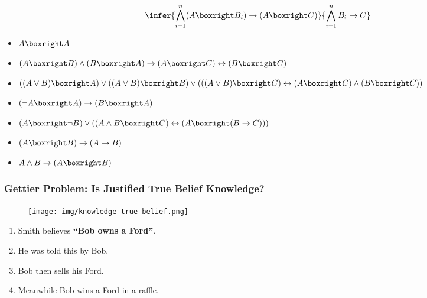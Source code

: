 \documentclass[UTF8,11pt,colorlinks,compress,openany]{beamer}%
\begin{document}
\begin{frame}\frametitle{}
\[
\infer{\bigwedge\limits_{i=1}^n (A\boxright B_i)\to(A\boxright C)}{\bigwedge\limits_{i=1}^n B_i\to C}
\]
\begin{itemize}
	\item $A\boxright A$
	\item $(A\boxright B)\wedge (B\boxright A)\to(A\boxright C)\leftrightarrow(B\boxright C)$
	\item $((A\vee B)\boxright A)\vee((A\vee B)\boxright B)\vee(((A\vee B)\boxright C)\leftrightarrow(A\boxright C)\wedge(B\boxright C))$
	\item $(\neg A\boxright A)\to(B\boxright A)$
	\item $(A\boxright \neg B)\vee((A\wedge B\boxright C)\leftrightarrow(A\boxright(B\to C)))$
	\item $(A\boxright B)\to(A\to B)$
	\item $A\wedge B\to (A\boxright B)$
\end{itemize}
\end{frame}

\begin{frame}\frametitle{Gettier Problem: Is Justified True Belief Knowledge?}
\begin{figure}
\texttt{[image: img/knowledge-true-belief.png]}
\end{figure}
\begin{enumerate}
	\item Smith believes \textbf{``Bob owns a Ford''}.
	\item He was told this by Bob.
	\item Bob then sells his Ford.
	\item Meanwhile Bob wins a Ford in a raffle.
\end{enumerate}
\end{frame}
\end{document}
